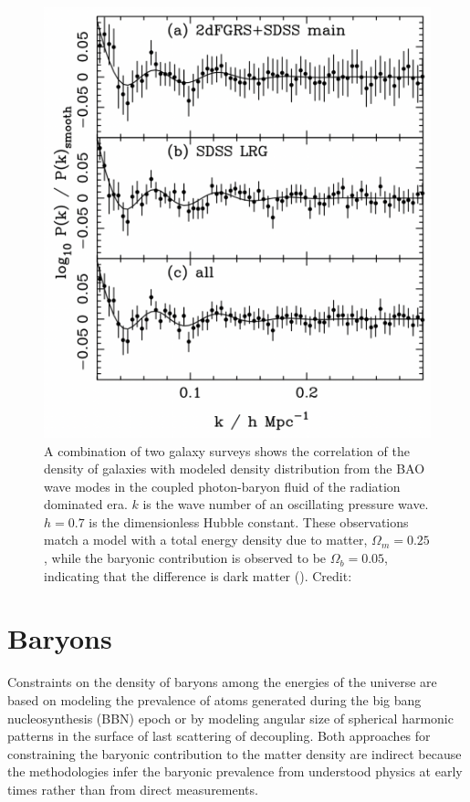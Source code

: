 \documentclass{paper}
\begin{document}
  \begin{figure}[H]
    \begin{centering}
    \includegraphics[scale=0.5]{DM-BAO.pdf}
    \caption{A combination of two galaxy surveys shows the correlation of
      the density of galaxies with modeled density distribution from the
      BAO wave modes in the coupled photon-baryon
      fluid of the radiation dominated era. $k$ is the wave number of 
      an oscillating pressure wave. \(h = 0.7\) is the dimensionless Hubble
      constant. These observations match a model with a total energy density
      due to matter, \(\Omega_m = 0.25\), while the baryonic contribution is
      observed to be \(\Omega_b = 0.05\), indicating that the 
      difference is dark matter (\cite{Eisenstein_2005}).
    Credit: \cite{2007MNRAS.381.1053P}}
    \label{fig:DM-BAO}
    \end{centering}
  \end{figure}

\section*{Baryons}
  Constraints on the density of baryons among the energies of the universe are
  based on modeling the prevalence of atoms generated during the big bang 
  nucleosynthesis (BBN) epoch or by modeling angular size of spherical harmonic 
  patterns in the surface of last scattering of decoupling. Both 
  approaches for constraining the baryonic contribution to the matter density 
  are indirect because the methodologies infer the baryonic prevalence from 
  understood physics at early times rather than from direct measurements.
\end{document}
